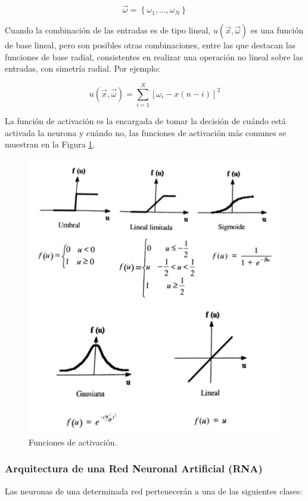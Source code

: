 		\begin{equation}\label{eq:ej}
			\vec{\omega}=\left\{ \omega_1,..., \omega_N	\right\}
		\end{equation}		

		Cuando la combinación de las entradas es de tipo lineal, $u(\vec{x},\vec{\omega})$ es una función de base lineal, pero son posibles otras combinaciones, entre las que destacan las funciones de base radial, consistentes en realizar una operación no lineal sobre las entradas, con simetría radial. Por ejemplo:

		\begin{equation}\label{eq:ej}
			u\left(\vec{x},\vec{\omega}\right)=\sum_{i=1}^{N}\left[\omega_i-x\left(n-i\right)\right]^2
		\end{equation}		


		La función de activación es la encargada de tomar la decisión de cuándo está activada la neurona y cuándo no, las funciones de activación más comunes se muestran en la Figura \ref{fig:funcionesAct}.

		\begin{figure}[H]
			\centering
			\includegraphics[width=0.6\linewidth]{figures/funcionesAct}
			\caption{Funciones de activación.}
			\label{fig:funcionesAct}
		\end{figure}		

		\subsubsection{Arquitectura de una Red Neuronal Artificial (RNA)}

		Las neuronas de una determinada red pertenecerán a una de las siguientes clases:

